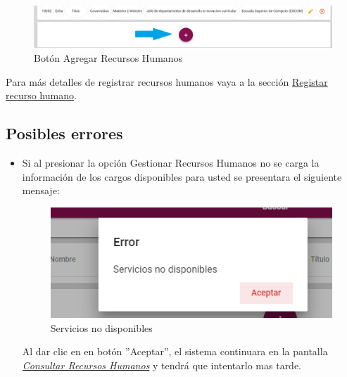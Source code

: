             \begin{figure}[!hbtp]
                \centering
                \hypertarget{add}{\includegraphics[width=0.7\linewidth]{images/SP1/BtnAgregar}}
                \caption{Botón Agregar Recursos Humanos}
                \label{add}
            \end{figure}
    
            Para más detalles de registrar recursos humanos vaya a la sección \hyperlink{registrar}{Registar recurso humano}.
            
        \subsection{Posibles errores}
          \begin{itemize}   
                \item Si al  presionar la opción Gestionar Recursos Humanos no se carga la información de los cargos disponibles para usted se presentara el siguiente mensaje:
            
             \begin{figure}[!hbtp]
                \centering
                \includegraphics[width=0.4\linewidth]{images/SP1/MSGSN}
                \caption{Servicios no disponibles}
                \label{SND}
                
            \end{figure}
            
                    Al dar clic en en botón ''Aceptar'', el sistema continuara en la pantalla  \hyperlink{consultarRH}{\textit{Consultar Recursos Humanos}} y tendrá que intentarlo  mas tarde.
            
           
           \end{itemize} 

